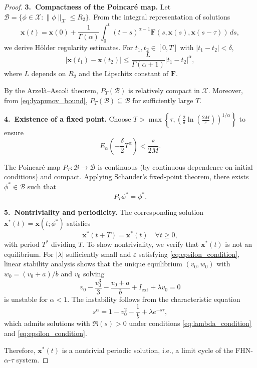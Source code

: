 \documentclass[10pt,a4paper]{amsart}
\begin{document}
\begin{proof}
	\noindent\textbf{3.~Compactness of the Poincaré map.}
	Let $\mathcal{B} = \{\phi \in \mathcal{X} : \|\phi\|_{\mathcal{X}} \leq R_2\}$.
	From the integral representation of solutions
	\begin{equation}
		\mathbf{x}(t) = \mathbf{x}(0) + \frac{1}{\Gamma(\alpha)} \int_0^t (t-s)^{\alpha-1} \mathbf{F}(s,\mathbf{x}(s),\mathbf{x}(s-\tau))\, ds,
		\label{eq:solution_representation}
	\end{equation}
	we derive Hölder regularity estimates. For $t_1, t_2 \in [0, T]$ with $|t_1 - t_2| < \delta$,
	\begin{equation}
		|\mathbf{x}(t_1) - \mathbf{x}(t_2)| \leq \frac{L}{\Gamma(\alpha+1)} |t_1 - t_2|^\alpha,
		\label{eq:holder_estimate}
	\end{equation}
	where $L$ depends on $R_2$ and the Lipschitz constant of $\mathbf{F}$.
	
	By the Arzelà--Ascoli theorem, $P_T(\mathcal{B})$ is relatively compact in $\mathcal{X}$.
	Moreover, from \eqref{eq:lyapunov_bound}, $P_T(\mathcal{B}) \subseteq \mathcal{B}$ for sufficiently large $T$.
	
	\noindent\textbf{4.~Existence of a fixed point.}
	Choose $T > \max\left\{\tau, \left(\frac{2}{\delta}\ln\left(\frac{2M}{\varepsilon}\right)\right)^{1/\alpha}\right\}$ to ensure
	\begin{equation}
		E_\alpha\left(-\frac{\delta}{2} T^\alpha\right) < \frac{\varepsilon}{2M}.
		\label{eq:period_condition}
	\end{equation}
	
	The Poincaré map $P_T: \mathcal{B} \to \mathcal{B}$ is continuous (by continuous dependence on initial conditions) and compact. 
	Applying Schauder's fixed-point theorem, there exists $\phi^* \in \mathcal{B}$ such that
	\begin{equation}
		P_T \phi^* = \phi^*.
		\label{eq:fixed_point}
	\end{equation}
	
	\noindent\textbf{5.~Nontriviality and periodicity.}
	The corresponding solution $\mathbf{x}^*(t) = \mathbf{x}(t; \phi^*)$ satisfies
	\begin{equation}
		\mathbf{x}^*(t+T) = \mathbf{x}^*(t) \quad \forall t \geq 0,
		\label{eq:periodicity}
	\end{equation}
	with period $T^*$ dividing $T$. To show nontriviality, we verify that $\mathbf{x}^*(t)$ is not an equilibrium. 
	For $|\lambda|$ sufficiently small and $\varepsilon$ satisfying \eqref{eq:epsilon_condition}, linear stability analysis shows that the unique equilibrium $(v_0, w_0)$ with $w_0 = (v_0+a)/b$ and $v_0$ solving
	\begin{equation}
		v_0 - \frac{v_0^3}{3} - \frac{v_0+a}{b} + I_{\text{ext}} + \lambda v_0 = 0
		\label{eq:equilibrium}
	\end{equation}
	is unstable for $\alpha < 1$. The instability follows from the characteristic equation
	\begin{equation}
		s^\alpha = 1 - v_0^2 - \frac{1}{b} + \lambda e^{-s\tau},
		\label{eq:characteristic}
	\end{equation}
	which admits solutions with $\Re(s) > 0$ under conditions \eqref{eq:lambda_condition} and \eqref{eq:epsilon_condition}.
	
	Therefore, $\mathbf{x}^*(t)$ is a nontrivial periodic solution, i.e., a limit cycle of the FHN-$\alpha$-$\tau$ system.
\end{proof}
\end{document}
